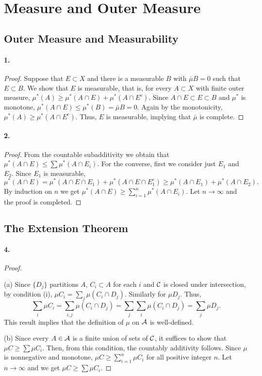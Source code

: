 \section{Measure and Outer Measure}
\subsection{Outer Measure and Measurability}
  \paragraph{1.}
  \begin{proof}
    Suppose that $E\subset X$ and there is a measurable $B$ with $\bar{\mu}B=0$
    such that $E\subset B$. We show that $E$ is measurable, that is, for every
    $A\subset X$ with finite outer measure, $\mu^*(A)\ge\mu^*(A\cap E)+\mu^*(
    A\cap E^c)$. Since $A\cap E\subset E\subset B$ and $\mu^*$ is monotone,
    $\mu^*(A\cap E)\le\mu^*(B)=\bar{\mu}B=0$. Again by the monotonicity, $\mu^*(
    A)\ge\mu^*(A\cap E^c)$. Thus, $E$ is measurable, implying that $\bar{\mu}$
    is complete.
  \end{proof}

  \paragraph{2.}
  \begin{proof}
    From the countable subadditivity we obtain that $\mu^*(A\cap E)\le\sum\mu^*
    (A\cap E_i)$. For the converse, first we consider just $E_1$ and $E_2$. 
    Since $E_1$ is measurable,
    \[
      \mu^*(A\cap E)=\mu^*(A\cap E\cap E_1)+\mu^*(A\cap E\cap E_1^c)
      \ge\mu^*(A\cap E_1)+\mu^*(A\cap E_2).
    \]
    By induction on $n$ we get $\mu^*(A\cap E)\ge\sum_{i=1}^n\mu^*(A\cap E_i)$.
    Let $n\to\infty$ and the proof is completed.
  \end{proof}
\subsection{The Extension Theorem}
  \paragraph{4.}
  \begin{proof}
    $\,$\par
    (a) Since $\{D_j\}$ partitions $A$, $C_i\subset A$ for each $i$ and 
    $\mathcal{C}$ is closed under intersection, by condition (i), $\mu C_i=\sum_j 
    \mu(C_i\cap D_j)$. Similarly for $\mu D_j$. Thus,
    \[
      \sum_i\mu C_i=\sum_{i,j}\mu(C_i\cap D_j)=
      \sum_j\sum_i\mu(C_i\cap D_j)=\sum_j\mu D_j.
    \]
    This result implies that the definition of $\mu$ on $\mathcal{A}$ is 
    well-defined. \par
    (b) Since every $A\in\mathcal{A}$ is a finite union of sets of $\mathcal{C}$, it
    suffices to show that $\mu C\ge\sum\mu C_i$. Then, from this condition, the
    countably additivity follows. Since $\mu$ is nonnegative and monotone, 
    $\mu C\ge\sum_{i=1}^n\mu C_i$ for all positive integer $n$. Let $n\to\infty$
    and we get $\mu C\ge\sum\mu C_i$.
  \end{proof}

